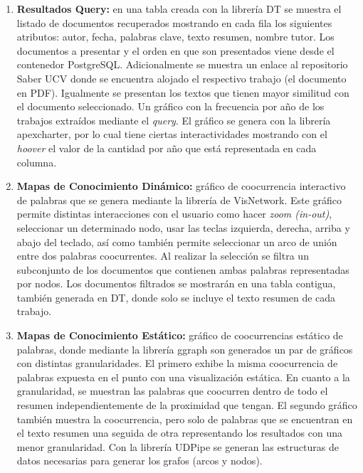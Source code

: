 \documentclass[
  12pt,
  openany]{book}
\begin{document}
\begin{enumerate}
\begin{enumerate}
    \begin{enumerate}
    \def\labelenumiii{\roman{enumiii}.}
    \item
      \textbf{Resultados Query:} en una tabla creada con la librería DT se muestra el listado de documentos recuperados mostrando en cada fila los siguientes atributos: autor, fecha, palabras clave, texto resumen, nombre tutor. Los documentos a presentar y el orden en que son presentados viene desde el contenedor PostgreSQL. Adicionalmente se muestra un enlace al repositorio Saber UCV donde se encuentra alojado el respectivo trabajo (el documento en PDF). Igualmente se presentan los textos que tienen mayor similitud con el documento seleccionado. Un gráfico con la frecuencia por año de los trabajos extraídos mediante el \emph{query}. El gráfico se genera con la librería apexcharter, por lo cual tiene ciertas interactividades mostrando con el \emph{hoover} el valor de la cantidad por año que está representada en cada columna.
    \item
      \textbf{Mapas de Conocimiento Dinámico:} gráfico de coocurrencia interactivo de palabras que se genera mediante la librería de VisNetwork. Este gráfico permite distintas interacciones con el usuario como hacer \emph{zoom (in-out)}, seleccionar un determinado nodo, usar las teclas izquierda, derecha, arriba y abajo del teclado, así como también permite seleccionar un arco de unión entre dos palabras coocurrentes. Al realizar la selección se filtra un subconjunto de los documentos que contienen ambas palabras representadas por nodos. Los documentos filtrados se mostrarán en una tabla contigua, también generada en DT, donde solo se incluye el texto resumen de cada trabajo.
    \item
      \textbf{Mapas de Conocimiento Estático:} gráfico de coocurrencias estático de palabras, donde mediante la librería ggraph son generados un par de gráficos con distintas granularidades. El primero exhibe la misma coocurrencia de palabras expuesta en el punto con una visualización estática. En cuanto a la granularidad, se muestran las palabras que coocurren dentro de todo el resumen independientemente de la proximidad que tengan. El segundo gráfico también muestra la coocurrencia, pero solo de palabras que se encuentran en el texto resumen una seguida de otra representando los resultados con una menor granularidad. Con la librería UDPipe se generan las estructuras de datos necesarias para generar los grafos (arcos y nodos).
    \end{enumerate}


\end{enumerate}
\end{enumerate}
\end{document}
